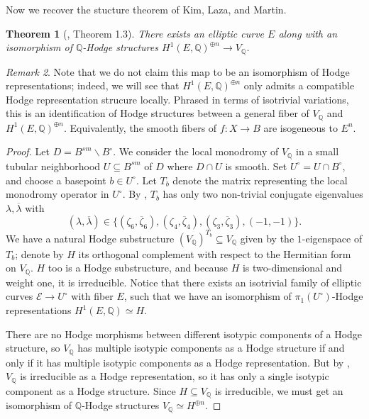 \documentclass[12pt]{amsart}
\newcommand{\Q}{\mathbb{Q}}
\newtheorem{theorem}{Theorem}[section]
\theoremstyle{definition}
\theoremstyle{remark}
\newtheorem{remark}[theorem]{Remark}
\numberwithin{equation}{section}
\begin{document}
Now we recover the stucture theorem of Kim, Laza, and Martin.
\begin{theorem}[\cite{kim-laza-martin23}, Theorem 1.3] \label{elliptic-curve-theorem}
    There exists an elliptic curve \(E\) along with an isomorphism of \(\Q\)-Hodge 
    structures \(H^1(E, \Q)^{\oplus n} \to V_\Q\).
\end{theorem}
\begin{remark}
Note that we do not claim this map to be an isomorphism of Hodge 
representations; indeed, we will see that \(H^1(E, \Q)^{\oplus n}\) only admits 
a compatible Hodge representation strucure  
locally. Phrased in terms of isotrivial variations,
this is an identification of Hodge structures between a general fiber of 
\(V_\Q\) and \(H^1(E, \Q)^{\oplus n}\). Equivalently, the smooth fibers of
\(f: X \to B\) are isogeneous to \(E^n\).
\end{remark}
\begin{proof}
Let \(D = B^{sm} \smallsetminus B^{\circ}\). We consider the local monodromy of 
\(V_\Q\) in a small tubular neighborhood \(U \subseteq B^{sm}\) of \(D\) where
\(D \cap U\) is smooth. Set \(U^\circ = U \cap B^\circ\), and choose a basepoint
\(b \in U^\circ\). Let \(T_b\) denote the matrix representing the local monodromy
operator in \(U^\circ\). 
By \cite[Lemma 3.6]{bak-sch23}, \(T_b\) has only two
non-trivial conjugate eigenvalues \(\lambda, \overline{\lambda}\) with
\begin{equation} \label{eq-possible-eigenvalues}
    (\lambda, \overline{\lambda}) \in \{(\zeta_6, \overline{\zeta}_6),
    (\zeta_4, \overline{\zeta}_4), (\zeta_3, \overline{\zeta}_3), (-1, -1)\}.
\end{equation}
We have a natural Hodge substructure \((V_\Q)^{T_b} \subseteq V_\Q\) 
given by the \(1\)-eigenspace of \(T_b\); denote by \(H\) its orthogonal 
complement with respect to the Hermitian form on \(V_\Q\). \(H\) too 
is a Hodge substructure, and because \(H\) is two-dimensional and weight one,
it is irreducible. Notice that there exists an isotrivial family of elliptic 
curves \(\mathcal{E} \to U^\circ\) with fiber \(E\), such that we have an 
isomorphism of \(\pi_1(U^\circ)\)-Hodge representations \(H^1(E, \Q) \simeq H\).

There are no Hodge morphisms between different isotypic 
components of a Hodge structure, so \(V_\Q\) has multiple isotypic components 
as a Hodge structure if and only if it has multiple isotypic components as a 
Hodge representation. But by , \(V_\Q\) is
irreducible as a Hodge representation, so it has only a single isotypic component 
as a Hodge structure. Since \(H \subseteq V_\Q\) is irreducible, we must get 
an isomorphism of \(\Q\)-Hodge structures \(V_\Q \simeq H^{\oplus n}\).
\end{proof}
\end{document}
